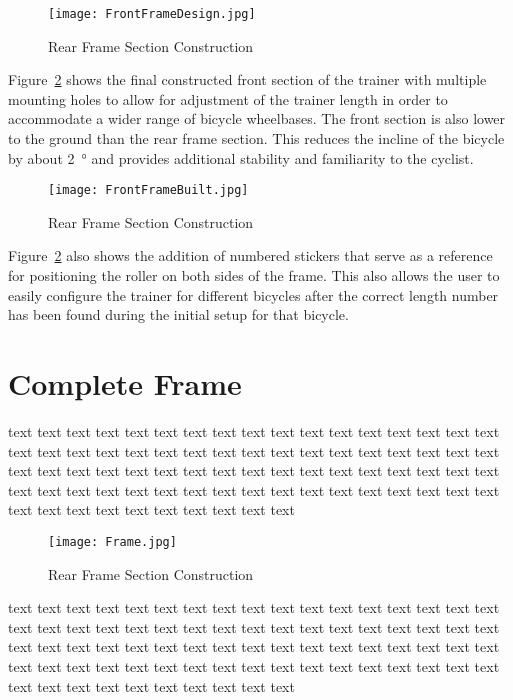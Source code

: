 \begin{figure}[H]
	\centering
	\texttt{[image: FrontFrameDesign.jpg]}
	\caption{Rear Frame Section Construction}
	\label{fig:FrontDesign}
\end{figure}

\vspace*{-0.5cm}

Figure~\ref{fig:FrontBuilt} shows the final constructed front section of the trainer with multiple mounting holes to allow for adjustment of the trainer length in order to accommodate a wider range of bicycle wheelbases. The front section is also lower to the ground than the rear frame section. This reduces the incline of the bicycle by about \SI{2}{\degree} and provides additional stability and familiarity to the cyclist.

\begin{figure}[H]
	\centering
	\texttt{[image: FrontFrameBuilt.jpg]}
	\caption{Rear Frame Section Construction}
	\label{fig:FrontBuilt}
\end{figure}

\vspace*{-0.5cm}

Figure~\ref{fig:FrontBuilt} also shows the addition of numbered stickers that serve as a reference for positioning the roller on both sides of the frame. This also allows the user to easily configure the trainer for different bicycles after the correct length number has been found during the initial setup for that bicycle.

\section{Complete Frame}

text text text text text text text text text text text text text text text text text text text text text text text text text text text text text text text text text text text text text text text text text text text text text text text text text text text text text text text text text text text text text text text text text text text text text text text text text text text text text text 

\begin{figure}[H]
	\centering
	\texttt{[image: Frame.jpg]}
	\caption{Rear Frame Section Construction}
	\label{fig:1}
\end{figure}

text text text text text text text text text text text text text text text text text text text text text text text text text text text text text text text text text text text text text text text text text text text text text text text text text text text text text text text text text text text text text text text text text text text text text text text text text text text text text text 

